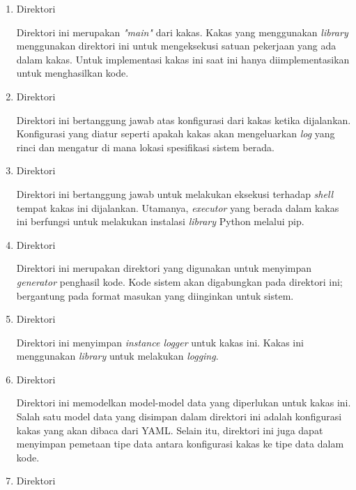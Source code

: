 \begin{enumerate}
    \item Direktori 

    Direktori ini merupakan \textit{"main"} dari kakas.
    Kakas yang menggunakan \textit{library}  menggunakan direktori ini untuk mengeksekusi satuan pekerjaan yang ada dalam kakas.
    Untuk implementasi kakas ini saat ini hanya diimplementasikan untuk menghasilkan kode.

    \item Direktori 
    
    Direktori ini bertanggung jawab atas konfigurasi dari kakas ketika dijalankan.
    Konfigurasi yang diatur seperti apakah kakas akan mengeluarkan \textit{log} yang rinci dan mengatur di mana lokasi spesifikasi sistem berada.

    \item Direktori 
    
    Direktori ini bertanggung jawab untuk melakukan eksekusi terhadap \textit{shell} tempat kakas ini dijalankan.
    Utamanya, \textit{executor} yang berada dalam kakas ini berfungsi untuk melakukan instalasi \textit{library} Python melalui pip.

    \item Direktori 
    
    Direktori ini merupakan direktori yang digunakan untuk menyimpan \textit{generator} penghasil kode.
    Kode sistem akan digabungkan pada direktori ini; bergantung pada format masukan yang diinginkan untuk sistem.

    \item Direktori 
    
    Direktori ini menyimpan \textit{instance logger} untuk kakas ini.
    Kakas ini menggunakan \textit{library}  untuk melakukan \textit{logging}.

    \item Direktori 
    
    Direktori ini memodelkan model-model data yang diperlukan untuk kakas ini.
    Salah satu model data yang disimpan dalam direktori ini adalah konfigurasi kakas yang akan dibaca dari YAML.
    Selain itu, direktori ini juga dapat menyimpan pemetaan tipe data antara konfigurasi kakas ke tipe data dalam kode.

    \item Direktori 
    

\end{enumerate}
